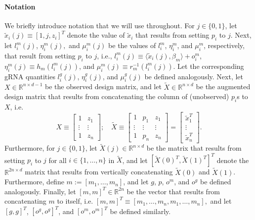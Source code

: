 \documentclass[12pt]{article}
\begin{document}
\paragraph{Notation} We briefly introduce notation that we will use throughout. For $j \in \{0,1\}$, let $\tilde{x}_i(j) \equiv [1, j, z_i]^T$ denote the value of $\tilde{x}_i$ that results from setting $p_i$ to $j$. Next, let  $l^m_i(j)$, $\eta^m_i(j),$ and $\mu^m_i(j)$ be the values of $l^m_i$, $\eta^m_i$, and $\mu^m_i$, respectively, that result from setting $p_i$ to $j$, i.e.,
$l^m_i(j) \equiv \langle \tilde{x}_i(j), \beta_m \rangle + o^m_i$, $\eta^m_i(j) \equiv h_m(l^m_i(j))$, and
$\mu_i^m(j) \equiv r_m^{-1}(l^m_i(j)).$ Let the corresponding gRNA quantities $l^g_i(j)$, $\eta_i^g(j)$, and $\mu^g_i(j)$ be defined analogously. Next, let $X \in \mathbb{R}^{n \times {d-1}}$ be the observed design matrix, and let $\tilde{X} \in \mathbb{R}^{n \times d}$ be the augmented design matrix that results from concatenating the column of (unobserved) $p_i$s to $X$, i.e.
$$ X \equiv \begin{bmatrix} 
1 & z_1 \\
\vdots & \vdots \\
1 & z_n
\end{bmatrix}; \quad 
\tilde{X} \equiv 
\begin{bmatrix}
1 & p_1 & z_1 \\
\vdots & \vdots & \vdots \\
1 & p_n & z_n
\end{bmatrix} = \begin{bmatrix}
\tilde{x}_1^T \\ \vdots \\ \tilde{x}_n^T
\end{bmatrix}.
$$ 
Furthermore, for $j \in \{0,1\}$, let $\tilde{X}(j) \in \mathbb{R}^{n \times d}$ be the matrix that results from setting $p_i$ to $j$ for all $i \in \{1, \dots, n\}$ in $\tilde{X}$, and let  $[\tilde{X}(0)^T, \tilde{X}(1)^T]^T$ denote the $\mathbb{R}^{2n \times d}$ matrix that results from vertically concatenating $\tilde{X}(0)$ and $\tilde{X}(1)$. Furthermore, define $m := [m_1, \dots, m_n]$, and let $g$, $p$, $o^m$, and $o^g$ be defined analogously. Finally, let $[m,m]^T \in \mathbb{R}^{2n}$ be the vector that results from concatenating $m$ to itself, i.e.
$[m,m]^T \equiv [m_1, \dots, m_n, m_1, \dots, m_n],$ and let $[g,g]^T$, $[o^g,o^g]^T$, and $[o^m,o^m]^T$ be defined similarly. 
\end{document}
